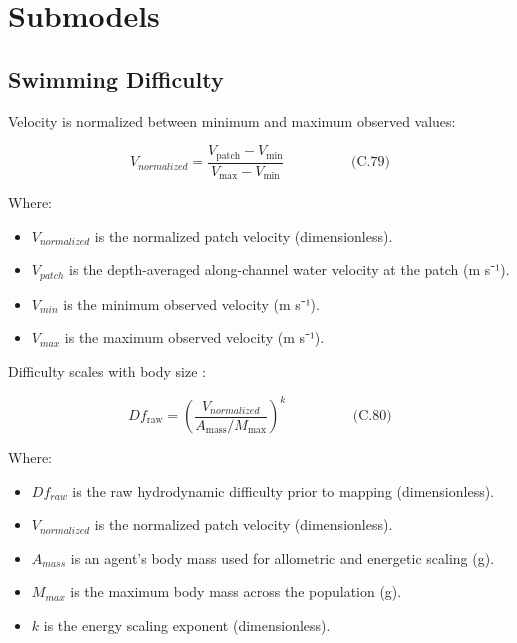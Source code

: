 \documentclass[
]{book}
\begin{document}
\section{Submodels}\label{submodels-7}

\subsection{Swimming Difficulty}\label{swimming-difficulty-1}

Velocity is normalized between minimum and maximum observed values:

\[
\begin{equation} V_{normalized}
= 
\frac{V_{\text{patch}} - V_{\min}}
{V_{\max} - V_{\min}}  \hspace{2cm} \text{(C.79)} \end{equation}
\]

Where:

\begin{itemize}
\item
  \(V_{normalized}\) is the normalized patch velocity (dimensionless).
\item
  \(V_{patch}\) is the depth-averaged along-channel water velocity at
  the patch (m s⁻¹).
\item
  \(V_{min}\) is the minimum observed velocity (m s⁻¹).
\item
  \(V_{max}\) is the maximum observed velocity (m s⁻¹).
\end{itemize}

Difficulty scales with body size \citep{brown_toward_2004, gibson_selective_2001}:

\[
\begin{equation} Df_{\text{raw}}
=
\left(
\frac{V_{normalized}}
{A_{\text{mass}} / M_{\max}}
\right)^k  \hspace{2cm} \text{(C.80)} \end{equation}
\]

Where:

\begin{itemize}
\item
  \(Df_{raw}\) is the raw hydrodynamic difficulty prior to mapping
  (dimensionless).
\item
  \(V_{normalized}\) is the normalized patch velocity (dimensionless).
\item
  \(A_{mass}\) is an agent's body mass used for allometric and energetic
  scaling (g).
\item
  \(M_{max}\) is the maximum body mass across the population (g).
\item
  \(k\) is the energy scaling exponent (dimensionless).
\end{itemize}
\end{document}
